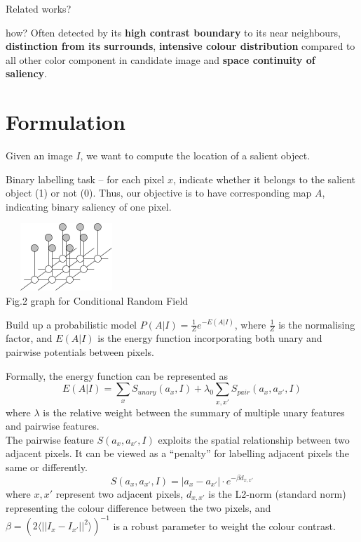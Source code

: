 \documentclass[10pt,twocolumn,letterpaper]{article}
\newcommand{\SUM}{\sum\limits}
\begin{document}
Related works?

how? Often detected by its \textbf{high contrast boundary} to its near neighbours, \textbf{distinction from its surrounds}, \textbf{intensive colour distribution} compared to all other color component in candidate image and \textbf{space continuity of saliency}. \\

\section{Formulation}
Given an image $I$, we want to compute the location of a salient object.

Binary labelling task -- for each pixel $x$, indicate whether it belongs to the salient object (1) or not (0). 
Thus, our objective is to have corresponding map $A$, indicating binary saliency of one pixel.

    \begin{center}
        \includegraphics[width=1.8in,height=1in]{./Figures/mrf.jpg} \\
        \footnotesize Fig.2 graph for Conditional Random Field
        \end{center}

    Build up a probabilistic model $P(A|I)=\frac{1}{Z}e^{-E(A|I)}$, where $\frac{1}{Z}$ is the normalising factor, and $E(A|I)$ is the energy function incorporating both unary and pairwise potentials between pixels.

    Formally, the energy function can be represented as
    $$
    E(A|I) = \SUM_x S_{unary}(a_x,I) + \lambda_0 \SUM_{x,x'}S_{pair}(a_x,a_{x'},I)
    $$
    where $\lambda$ is the relative weight between the summary of multiple unary features and pairwise features. \\[10pt]
    The pairwise feature $S(a_x,a_{x'},I)$ exploits the spatial relationship between two adjacent pixels.  It can be viewed as a ``penalty'' for labelling adjacent pixels the same or differently.
    $$
    S(a_x,a_{x'},I) = |a_x-a_{x'}| \cdot e^{-\beta d_{x,x'}}
    $$
    where $x,x'$ represent two adjacent pixels, $d_{x,x'}$ is the L2-norm (standard norm) representing the colour difference between the two pixels, and $\beta=(2\langle||I_x-I_{x'}||^2\rangle)^{-1}$ is a robust parameter to weight the colour contrast.
    
\end{document}
